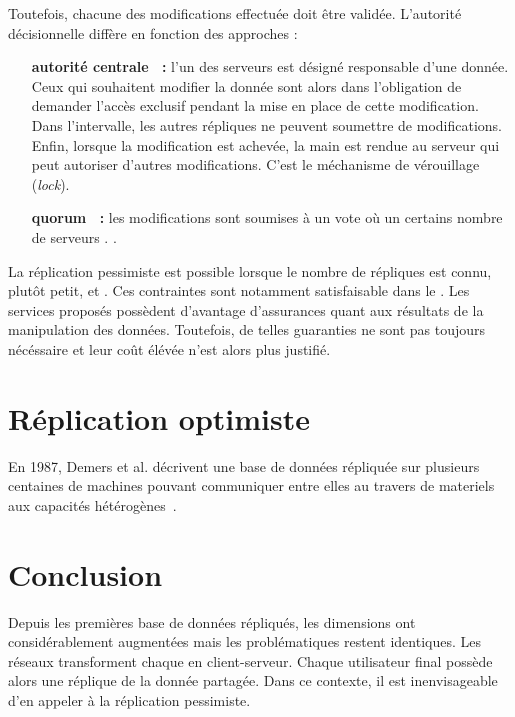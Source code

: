 Toutefois, chacune des modifications effectuée doit être validée. L'autorité
décisionnelle diffère en fonction des approches :
\begin{itemize}
\item [\textbf{autorité centrale~\cite{alsberg1976principle} :}] l'un des
  serveurs est désigné responsable d'une donnée. Ceux qui souhaitent modifier la
  donnée sont alors dans l'obligation de demander l'accès exclusif pendant la
  mise en place de cette modification. Dans l'intervalle, les autres répliques
  ne peuvent soumettre de modifications. Enfin, lorsque la modification est
  achevée, la main est rendue au serveur qui peut autoriser d'autres
  modifications. C'est le méchanisme de vérouillage (\emph{lock}).
\item [\textbf{quorum~\cite{gifford1979weighted} :}] les modifications sont
  soumises à un vote où un certains nombre de serveurs . .
\end{itemize}

La réplication pessimiste est possible lorsque le nombre de répliques est connu,
plutôt petit, et . Ces contraintes sont notamment
satisfaisable dans le . Les services proposés possèdent d'avantage
d'assurances quant aux résultats de la manipulation des données. Toutefois, de
telles guaranties ne sont pas toujours nécéssaire et leur coût élévée n'est
alors plus justifié. 

\section{Réplication optimiste}
\label{repl:sec:optimistic}

En 1987, Demers et al. décrivent une base de données répliquée sur plusieurs
centaines de machines pouvant communiquer entre elles au travers de materiels
aux capacités hétérogènes~\cite{demers1987epidemic}.


\section{Conclusion}

Depuis les premières base de données répliqués, les dimensions ont
considérablement augmentées mais les problématiques restent identiques. Les
réseaux  transforment chaque  en
client-serveur. Chaque utilisateur final possède alors une réplique de la donnée
partagée. Dans ce contexte, il est inenvisageable d'en appeler à la réplication
pessimiste. 

